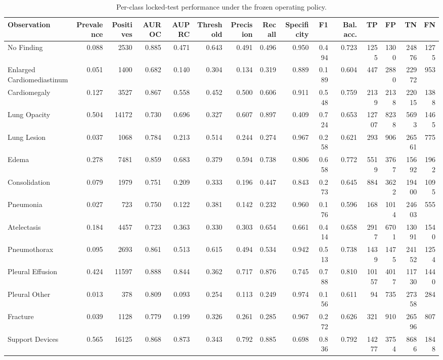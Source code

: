\begin{table}[t]
\centering
\scriptsize
\begin{tabular}{lrrrrrrrrrrrrrr}
\hline
Observation & Prevalence & Positives & AUROC & AUPRC & Threshold & Precision & Recall & Specificity & F1 & Bal. acc. & TP & FP & TN & FN \\
\hline
No Finding & 0.088 & 2530 & 0.885 & 0.471 & 0.643 & 0.491 & 0.496 & 0.950 & 0.494 & 0.723 & 1255 & 1300 & 24876 & 1275 \\
Enlarged Cardiomediastinum & 0.051 & 1400 & 0.682 & 0.140 & 0.304 & 0.134 & 0.319 & 0.889 & 0.189 & 0.604 & 447 & 2880 & 22972 & 953 \\
Cardiomegaly & 0.127 & 3527 & 0.867 & 0.558 & 0.452 & 0.500 & 0.606 & 0.911 & 0.548 & 0.759 & 2139 & 2138 & 22015 & 1388 \\
Lung Opacity & 0.504 & 14172 & 0.730 & 0.696 & 0.327 & 0.607 & 0.897 & 0.409 & 0.724 & 0.653 & 12707 & 8238 & 5693 & 1465 \\
Lung Lesion & 0.037 & 1068 & 0.784 & 0.213 & 0.514 & 0.244 & 0.274 & 0.967 & 0.258 & 0.621 & 293 & 906 & 26561 & 775 \\
Edema & 0.278 & 7481 & 0.859 & 0.683 & 0.379 & 0.594 & 0.738 & 0.806 & 0.658 & 0.772 & 5519 & 3767 & 15692 & 1962 \\
Consolidation & 0.079 & 1979 & 0.751 & 0.209 & 0.333 & 0.196 & 0.447 & 0.843 & 0.273 & 0.645 & 884 & 3622 & 19400 & 1095 \\
Pneumonia & 0.027 & 723 & 0.750 & 0.122 & 0.381 & 0.142 & 0.232 & 0.960 & 0.176 & 0.596 & 168 & 1014 & 24603 & 555 \\
Atelectasis & 0.184 & 4457 & 0.723 & 0.363 & 0.330 & 0.303 & 0.654 & 0.661 & 0.414 & 0.658 & 2917 & 6701 & 13091 & 1540 \\
Pneumothorax & 0.095 & 2693 & 0.861 & 0.513 & 0.615 & 0.494 & 0.534 & 0.942 & 0.513 & 0.738 & 1439 & 1475 & 24152 & 1254 \\
Pleural Effusion & 0.424 & 11597 & 0.888 & 0.844 & 0.362 & 0.717 & 0.876 & 0.745 & 0.788 & 0.810 & 10157 & 4017 & 11730 & 1440 \\
Pleural Other & 0.013 & 378 & 0.809 & 0.093 & 0.254 & 0.113 & 0.249 & 0.974 & 0.156 & 0.611 & 94 & 735 & 27358 & 284 \\
Fracture & 0.039 & 1128 & 0.779 & 0.199 & 0.326 & 0.261 & 0.285 & 0.967 & 0.272 & 0.626 & 321 & 910 & 26596 & 807 \\
Support Devices & 0.565 & 16125 & 0.868 & 0.873 & 0.343 & 0.792 & 0.885 & 0.698 & 0.836 & 0.792 & 14277 & 3754 & 8686 & 1848 \\
\hline
\end{tabular}
\caption{Per-class locked-test performance under the frozen operating policy.}
\label{tab:table2_per_class_final_performance}
\end{table}
